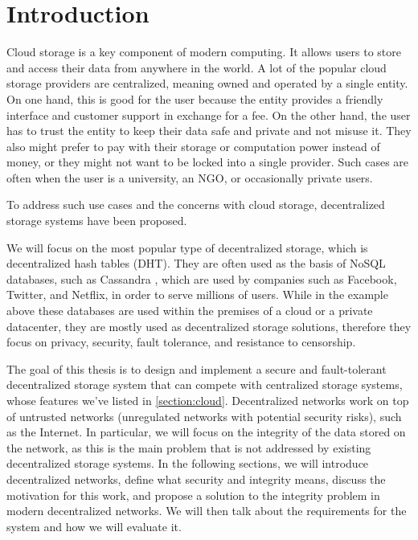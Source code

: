 \label{chapter:introduction}
\chapter{Introduction}

Cloud storage is a key component of modern computing.
It allows users to store and access their data from anywhere in the world.
A lot of the popular cloud storage providers are centralized, meaning owned and operated by a single entity.
On one hand, this is good for the user because the entity provides a friendly interface and customer support
in exchange for a fee.
On the other hand, the user has to trust the entity to keep their data safe and private and not misuse it.
They also might prefer to pay with their storage or computation power instead of money, or 
they might not want to be locked into a single provider.
Such cases are often when the user is a university, an NGO, or occasionally private users.

To address such use cases and the concerns with cloud storage, decentralized storage systems have been proposed.

We will focus on the most popular type of decentralized storage, which is decentralized hash tables (DHT).
They are often used as the basis of NoSQL databases, such as Cassandra \cite{cassandra},
which are used by companies such as Facebook, Twitter, and Netflix, in order to serve millions of users.
While in the example above these databases are used within the premises of a cloud or a private datacenter,
they are mostly used as decentralized storage solutions,
therefore they focus on privacy, security, fault tolerance, and resistance to censorship.

The goal of this thesis is to design and implement a secure and fault-tolerant decentralized storage system
that can compete with centralized storage systems, whose features we've listed in \ref{section:cloud}.
Decentralized networks work on top of untrusted networks (unregulated networks with potential security risks),
such as the Internet.
In particular, we will focus on the integrity of the data stored on the network,
as this is the main problem that is not addressed by existing decentralized storage systems.
In the following sections, we will introduce decentralized networks,
define what security and integrity means, discuss the motivation for this work,
and propose a solution to the integrity problem in modern decentralized networks.
We will then talk about the requirements for the system and how we will evaluate it.

